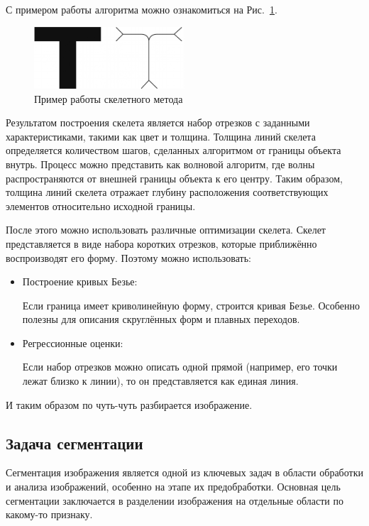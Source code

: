 С примером работы алгоритма можно ознакомиться на Рис.~\ref{fig:skeleton}.

\begin{figure}[h]
    \centering
    \includegraphics[width=0.5\textwidth]{skeleton.png}
    \caption{Пример работы скелетного метода}
    \label{fig:skeleton}
\end{figure}

Результатом построения скелета является набор отрезков с заданными характеристиками, такими как цвет и толщина. Толщина линий скелета определяется количеством шагов, сделанных алгоритмом от границы объекта внутрь. Процесс можно представить как волновой алгоритм, где волны распространяются от внешней границы объекта к его центру. Таким образом, толщина линий скелета отражает глубину расположения соответствующих элементов относительно исходной границы.

После этого можно использовать различные оптимизации скелета.
Скелет представляется в виде набора коротких отрезков, которые приближённо воспроизводят его форму. Поэтому можно использовать:
\begin{itemize}
    \item Построение кривых Безье:

          Если граница имеет криволинейную форму, строится кривая Безье. Особенно полезны для описания скруглённых форм и плавных переходов.
    \item Регрессионные оценки:

          Если набор отрезков можно описать одной прямой (например, его точки лежат близко к линии), то он представляется как единая линия.
\end{itemize}

И таким образом по чуть-чуть разбирается изображение.

\subsection{Задача сегментации}
Сегментация изображения является одной из ключевых задач в области обработки и анализа изображений, особенно на этапе их предобработки. Основная цель сегментации заключается в разделении изображения на отдельные области по какому-то признаку.

